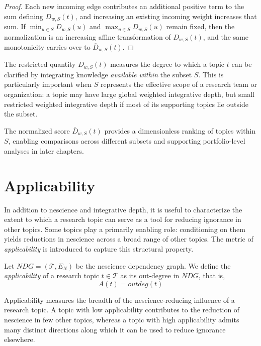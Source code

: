 \begin{proof}
Each new incoming edge contributes an additional positive term to the sum defining $D_{w,S}(t)$, and increasing an existing incoming weight increases that sum. If $\min_{u \in S} D_{w,S}(u)$ and $\max_{u \in S} D_{w,S}(u)$ remain fixed, then the normalization is an increasing affine transformation of $D_{w,S}(t)$, and the same monotonicity carries over to $\overline{D}_{w,S}(t)$.
\end{proof}

The restricted quantity $D_{w,S}(t)$ measures the degree to which a topic $t$ can be clarified by integrating knowledge \emph{available within} the subset $S$. This is particularly important when $S$ represents the effective scope of a research team or organization: a topic may have large global weighted integrative depth, but small restricted weighted integrative depth if most of its supporting topics lie outside the subset.

The normalized score $\overline{D}_{w,S}(t)$ provides a dimensionless ranking of topics within $S$, enabling comparisons across different subsets and supporting portfolio-level analyses in later chapters.

%
%

\section{Applicability}
\label{sec:applicability}

In addition to nescience and integrative depth, it is useful to characterize the extent to which a research topic can serve as a tool for reducing ignorance in other topics. Some topics play a primarily enabling role: conditioning on them yields reductions in nescience across a broad range of other topics. The metric of \emph{applicability} is introduced to capture this structural property.

\begin{definition}
Let $NDG = (\mathcal{T}, E_N)$ be the nescience dependency graph. We define the \emph{applicability} of a research topic $t \in \mathcal{T}$ as its out-degree in $NDG$, that is,
\[
A(t) = outdeg(t)
\]
\end{definition}

Applicability measures the breadth of the nescience-reducing influence of a research topic. A topic with low applicability contributes to the reduction of nescience in few other topics, whereas a topic with high applicability admits many distinct directions along which it can be used to reduce ignorance elsewhere.

